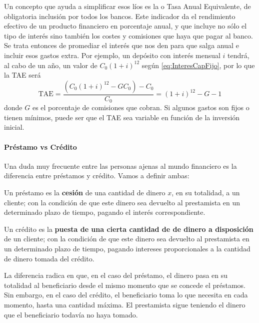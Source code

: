 \documentclass[nochap,palatino,shortheader]{apuntes}
\newcommand{\study}[1]{#1} \newcommand{\substudy}[1]{#1}
\begin{document}
Un concepto que ayuda a simplificar esos líos es la  o \study{Tasa Anual Equivalente}, \substudy{de obligatoria inclusión por todos los bancos}. Este indicador da el rendimiento efectivo de un producto financiero en porcentaje anual, y que incluye no sólo el tipo de interés sino también los costes y comisiones que haya que pagar al banco.
Se trata entonces de promediar el interés que nos den para que salga anual e incluir esos gastos extra.
Por ejemplo, un depósito con interés mensual $i$ tendrá, al cabo de un año, un valor de $C_0(1+i)^{12}$ según \eqref{eq:InteresCapFijo}, por lo que la TAE será \[ \mathrm{TAE} = \frac{(C_0(1+i)^{12} - GC_0) - C_0}{C_0} = (1+i)^{12} - G - 1 \] donde $G$ es el porcentaje de comisiones que cobran. Si algunos gastos son fijos o tienen mínimos, puede ser que el \study{TAE} sea \study{variable en función de la inversión inicial.}

\paragraph{Préstamo vs Crédito\\}


Una duda muy frecuente entre las personas ajenas al mundo financiero es la diferencia entre préstamos y crédito. Vamos a definir ambas:

\begin{defn}[Préstamo]
Un préstamo es la \textbf{cesión} de una cantidad de dinero $x$, en su totalidad, a un cliente; con la condición de que este dinero sea devuelto al prestamista en un determinado plazo de tiempo, pagando el interés correspondiente.
\end{defn}

\begin{defn}[Crédito]
Un crédito es la \textbf{puesta de una cierta cantidad de de dinero a disposición} de un cliente; con la condición de que este dinero sea devuelto al prestamista en un determinado plazo de tiempo, pagando intereses proporcionales a la cantidad de dinero tomada del crédito.
\end{defn}

La diferencia radica en que, en el caso del \study{préstamo}, el dinero pasa en \substudy{su totalidad al beneficiario} desde el mismo momento que se concede el préstamos.
Sin embargo, en el caso del \study{crédito}, \substudy{el beneficiario toma lo que necesita} en cada momento, \substudy{hasta una cantidad máxima}. El prestamista sigue teniendo el dinero que el beneficiario todavía no haya tomado.
\end{document}
